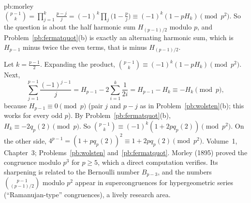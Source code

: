 \begin{solution}{pb:morley}
\idea $\binom{p-1}k=\prod_{j=1}^k\frac{p-j}j=(-1)^k\prod_j\bigl(1-\frac pj\bigr)\equiv(-1)^k(1-pH_k)\pmod{p^2}$. So the question is about the half
harmonic sum $H_{(p-1)/2}$ modulo $p$, and Problem~\ref{pb:fermatquot}(b) is exactly an alternating harmonic sum, which is
$H_{p-1}$ minus twice the even terms, that is minus $H_{(p-1)/2}$.

\writeup Let $k=\frac{p-1}2$. Expanding the product, $\binom{p-1}k\equiv(-1)^k(1-pH_k)\pmod{p^2}$. Next,
\[
\sum_{j=1}^{p-1}\frac{(-1)^{j-1}}j=H_{p-1}-2\sum_{i=1}^{k}\frac1{2i}=H_{p-1}-H_k\equiv-H_k\pmod p,
\]
because $H_{p-1}\equiv0\pmod p$ (pair $j$ and $p-j$ as in Problem~\ref{pb:wolsten}(b); this works for every odd $p$). By
Problem~\ref{pb:fermatquot}(b), $H_k\equiv-2q_p(2)\pmod p$. So $\binom{p-1}k\equiv(-1)^k(1+2pq_p(2))\pmod{p^2}$. On the other side,
$4^{p-1}=(1+pq_p(2))^2\equiv1+2pq_p(2)\pmod{p^2}$.
\tools Volume~1, Chapter~3; Problems~\ref{pb:wolsten} and~\ref{pb:fermatquot}.
\leads Morley (1895) proved the congruence modulo $p^3$ for $p\ge5$, which a direct computation verifies. Its sharpening is related to the
Bernoulli number $B_{p-3}$, and the numbers $\binom{p-1}{(p-1)/2}$ modulo $p^2$ appear in supercongruences for hypergeometric series
(``Ramanujan-type'' congruences), a lively research area.
\end{solution}

